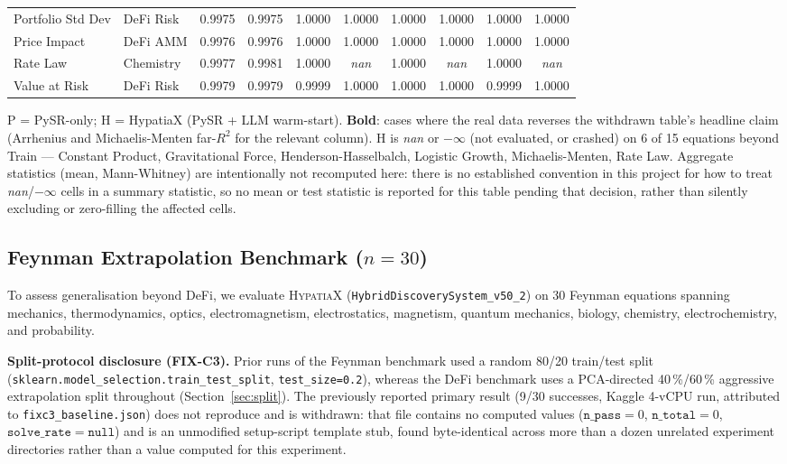 \documentclass[twoside,11pt]{article}
\begin{document}
\begin{table}[htbp]
{\begin{tabular}{llcccccccc}
Portfolio Std Dev & DeFi Risk & 0.9975 & 0.9975 & 1.0000 & 1.0000 & 1.0000 & 1.0000 & 1.0000 & 1.0000 \\
Price Impact & DeFi AMM & 0.9976 & 0.9976 & 1.0000 & 1.0000 & 1.0000 & 1.0000 & 1.0000 & 1.0000 \\
Rate Law & Chemistry & 0.9977 & 0.9981 & 1.0000 & \textit{nan} & 1.0000 & \textit{nan} & 1.0000 & \textit{nan} \\
Value at Risk & DeFi Risk & 0.9979 & 0.9979 & 0.9999 & 1.0000 & 1.0000 & 1.0000 & 0.9999 & 1.0000 \\
\bottomrule
\end{tabular}%
}%
\par\vspace{4pt}
{\footnotesize\noindent
P = PySR-only; H = HypatiaX (PySR + LLM warm-start). \textbf{Bold}: cases
where the real data reverses the withdrawn table's headline claim (Arrhenius
and Michaelis-Menten far-$R^2$ for the relevant column). H is \textit{nan}
or $-\infty$ (not evaluated, or crashed) on 6 of 15 equations beyond Train ---
Constant Product, Gravitational Force, Henderson-Hasselbalch, Logistic
Growth, Michaelis-Menten, Rate Law. Aggregate statistics (mean, Mann-Whitney)
are intentionally not recomputed here: there is no established convention
in this project for how to treat \textit{nan}/$-\infty$ cells in a summary
statistic, so no mean or test statistic is reported for this table pending
that decision, rather than silently excluding or zero-filling the affected
cells.
}
\end{table}

\subsection{Feynman Extrapolation Benchmark ($n=30$)}\label{subsec:feynman-extrapolation-benchmark-n30}
\label{sec:feynman30}

To assess generalisation beyond DeFi, we evaluate \textsc{HypatiaX}
(\texttt{HybridDiscoverySystem\_v50\_2}) on 30 Feynman equations spanning
mechanics, thermodynamics, optics, electromagnetism, electrostatics,
magnetism, quantum mechanics, biology, chemistry, electrochemistry, and
probability.

\textbf{Split-protocol disclosure (FIX-C3).}\quad
Prior runs of the Feynman benchmark used a random 80/20 train/test split
(\texttt{sklearn.model\_selection.train\_test\_split}, \texttt{test\_size=0.2}),
whereas the DeFi benchmark uses a PCA-directed 40\,\%/60\,\% aggressive
extrapolation split throughout (Section~\ref{sec:split}).
The previously reported primary result (9/30 successes, Kaggle 4-vCPU run,
attributed to \texttt{fixc3\_baseline.json}) does not reproduce and is
withdrawn: that file contains no computed values
($\mathtt{n\_pass}{=}0$, $\mathtt{n\_total}{=}0$, $\mathtt{solve\_rate}{=}\mathtt{null}$)
and is an unmodified setup-script template stub, found byte-identical across
more than a dozen unrelated experiment directories rather than a value
computed for this experiment.
\end{document}
